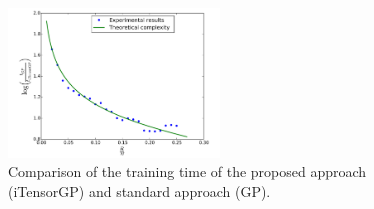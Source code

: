 \begin{figure}
  \centering
  \includegraphics[width=0.5\textwidth]{figures/incomplete_grid/time_comparison_itgp.pdf}
  \caption{Comparison of the training time of the proposed approach (iTensorGP) and
  standard approach (GP).}
  \label{fig:time_itgp}
\end{figure}


